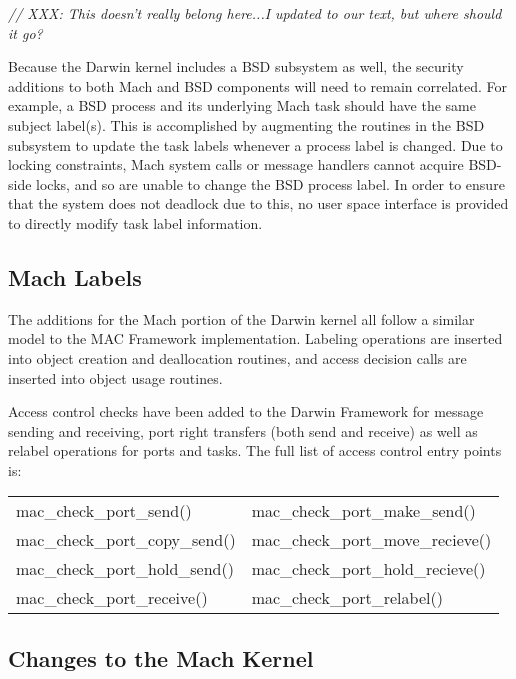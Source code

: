 \textit{// XXX: This doesn't really belong here...I updated to our text, but
where should it go?}

Because the Darwin kernel includes a BSD subsystem as well, the
security additions to both Mach and BSD components will need to
remain correlated. For example, a BSD process and its underlying
Mach task should have the same subject label(s). This is accomplished
by augmenting the routines in the BSD subsystem to update the task
labels whenever a process label is changed.  Due to locking
constraints, Mach system calls or message handlers cannot acquire
BSD-side locks, and so are unable to change the BSD process label.
In order to ensure that the system does not deadlock due to this,
no user space interface is provided to directly modify task label
information.


\subsection{Mach Labels}

The additions for the Mach portion of the Darwin kernel all follow a
similar model to the MAC Framework implementation. Labeling
operations are inserted into object creation and deallocation
routines, and access decision calls are inserted into object usage
routines.

Access control checks have been added to the Darwin Framework for
message sending and receiving, port right transfers (both send and
receive) as well as relabel operations for ports and tasks.  The
full list of access control entry points is:

\begin{center}
\begin{tabular}{ll}
mac\_check\_port\_send() & mac\_check\_port\_make\_send() \\
mac\_check\_port\_copy\_send() & mac\_check\_port\_move\_recieve() \\
mac\_check\_port\_hold\_send() & mac\_check\_port\_hold\_recieve() \\
mac\_check\_port\_receive() & mac\_check\_port\_relabel() \\
\end{tabular}
\end{center}

\subsection{Changes to the Mach Kernel}

